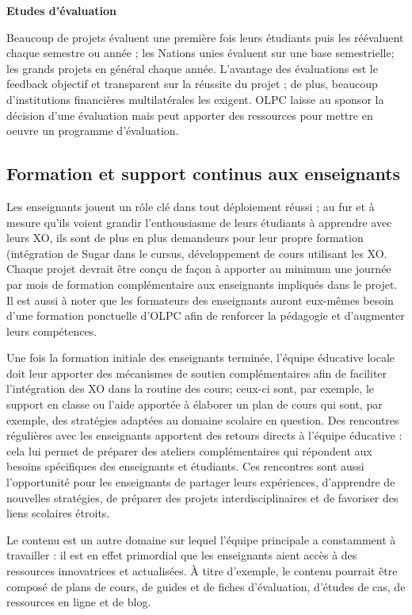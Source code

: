 \documentclass[12pt]{article}
\begin{document}
\textbf{Etudes d'évaluation}


Beaucoup de projets évaluent une première fois leurs étudiants puis les
réévaluent chaque semestre ou année ; les Nations unies évaluent sur une
base semestrielle; les grands projets en général chaque année. L'avantage
des évaluations est le feedback objectif et transparent sur la réussite du
projet ; de plus, beaucoup d'institutions financières multilatérales les
exigent. OLPC laisse au sponsor la décision d'une évaluation mais peut
apporter des ressources pour mettre en oeuvre un programme d'évaluation.
\subsection{Formation et support continus aux enseignants}
\label{sec-10-1}



Les enseignants jouent un rôle clé dans tout déploiement réussi ; au fur et
à mesure qu'ils voient grandir l'enthousiasme de leurs étudiants à
apprendre avec leurs XO, ils sont de plus en plus demandeurs pour leur
propre formation (intégration de Sugar dans le cursus, développement de
cours utilisant les XO. Chaque projet devrait être conçu de façon à
apporter au minimum une journée par mois de formation complémentaire aux
enseignants impliqués dans le projet. Il est aussi à noter que les
formateurs des enseignants auront eux-mêmes besoin d'une formation
ponctuelle d'OLPC afin de renforcer la pédagogie et d'augmenter leurs
compétences.

Une fois la formation initiale des enseignants terminée, l'équipe éducative
locale doit leur apporter des mécanismes de soutien complémentaires afin de
faciliter l'intégration des XO dans la routine des cours; ceux-ci sont, par
exemple, le support en classe ou l'aide apportée à élaborer un plan de
cours qui sont, par exemple, des stratégies adaptées au domaine scolaire en
question.  Des rencontres régulières avec les enseignants apportent des
retours directs à l'équipe éducative : cela lui permet de préparer des
ateliers complémentaires qui répondent aux besoins spécifiques des
enseignants et étudiants. Ces rencontres sont aussi l'opportunité pour les
enseignants de partager leurs expériences, d'apprendre de nouvelles
stratégies, de préparer des projets interdisciplinaires et de favoriser des
liens scolaires étroits.

Le contenu est un autre domaine sur lequel l'équipe principale a
constamment à travailler : il est en effet primordial que les enseignants
aient accès à des ressources innovatrices et actualisées. À titre
d'exemple, le contenu pourrait être composé de plans de cours, de guides et
de fiches  d'évaluation, d'études de cas, de ressources en ligne et de
blog.
\end{document}
